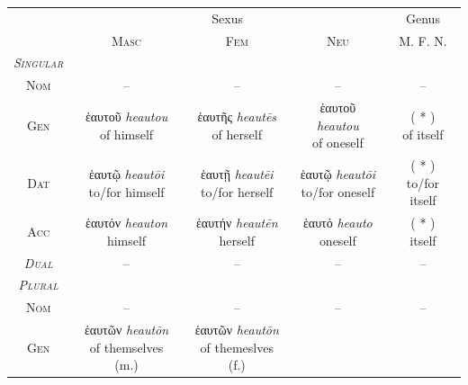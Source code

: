 \documentclass[10pt,a4paper,notitlepage]{article}
\newcommand{\tsc}[1]{\textsc{#1}}
\newcommand*{\grc}[1]{\fontspec{Inter}#1\rmfamily}
\newcommand{\trc}[1]{\textit{\fontspec{Tinos}#1}}
\begin{document}
    \begin{table}[H]
        \begin{tabular}{c|ccc|c}
            & \multicolumn{3}{c|}{Sexus} & Genus \\
            & \tsc{Masc} & \tsc{Fem} & \tsc{Neu} & \tsc{M. F. N.} \\
            \hline
            \emph{\tsc{Singular}} & & & & \\
            \tsc{Nom} & -- & -- & -- & -- \\
            \tsc{Gen} & \makecell{\grc{ἑαυτοῦ} \trc{heautou} \\ \small of himself}
                    & \makecell{\grc{ἑαυτῆς} \trc{heautēs} \\ \small of herself}
                    & \makecell{\grc{ἑαυτοῦ} \trc{heautou} \\ \small of oneself}
                    & \makecell{( * ) \\ \small of itself} \\
            \tsc{Dat} & \makecell{\grc{ἑαυτῷ} \trc{heautōi} \\ \small to/for himself}
                    & \makecell{\grc{ἑαυτῇ} \trc{heautēi} \\ \small to/for herself}
                    & \makecell{\grc{ἑαυτῷ} \trc{heautōi} \\ \small to/for oneself}
                    & \makecell{( * ) \\ \small to/for itself} \\
            \tsc{Acc} & \makecell{\grc{ἑαυτόν} \trc{heauton} \\ \small himself}
                    & \makecell{\grc{ἑαυτήν} \trc{heautēn} \\ \small herself}
                    & \makecell{\grc{ἑαυτό} \trc{heauto} \\ \small oneself}
                    & \makecell{( * ) \\ \small itself} \\
            \hline
            \emph{\tsc{Dual}} & -- & -- & -- & -- \\
            \hline
            \emph{\tsc{Plural}} & & & & \\
            \tsc{Nom} & -- & -- & -- & -- \\
            \tsc{Gen} & \makecell{\grc{ἑαυτῶν} \trc{heautōn} \\ \small of themselves (m.)}
                    & \makecell{\grc{ἑαυτῶν} \trc{heautōn} \\ \small of themeslves (f.)}

\end{tabular}
\end{table}
\end{document}

